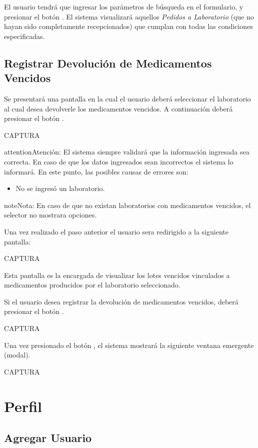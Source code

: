 \documentclass[a4paper,10pt,spanish]{sphinxmanual}
\begin{document}
El usuario tendrá que ingresar los parámetros de búsqueda en el formulario, y presionar el botón . El sistema visualizará aquellos \emph{Pedidos a Laboratorio} (que no hayan sido completamente recepcionados) que cumplan con todas las condiciones especificadas.


\section{Registrar Devolución de Medicamentos Vencidos}
\label{devolucionvencidos::doc}\label{devolucionvencidos:registrar-devolucion-de-medicamentos-vencidos}
Se presentará una pantalla en la cual el usuario deberá seleccionar el laboratorio al cual desea devolverle los medicamentos vencidos. A continuación deberá presionar el botón .

CAPTURA

\begin{notice}{attention}{Atención:}
El sistema siempre validará que la información ingresada sea correcta. En caso de que los datos ingresados sean incorrectos el sistema lo informará. En este punto, las posibles causas de errores son:
\begin{itemize}
\item {} 
No se ingresó un laboratorio.

\end{itemize}
\end{notice}

\begin{notice}{note}{Nota:}
En caso de que no existan laboratorios con medicamentos vencidos, el selector no mostrara opciones.
\end{notice}

Una vez realizado el paso anterior el usuario sera redirigido a la siguiente pantalla:

CAPTURA

Esta pantalla es la encargada de visualizar los lotes vencidos vinculados a medicamentos producidos por el laboratorio seleccionado.

Si el usuario desea registrar la devolución de medicamentos vencidos, deberá presionar el botón .

CAPTURA

Una vez presionado el botón , el sistema mostrará la siguiente ventana emergente (modal).

CAPTURA


\chapter{Perfil}
\label{perfil:perfil}\label{perfil::doc}

\section{Agregar Usuario}
\label{agregarusuario::doc}\label{agregarusuario:agregar-usuario}


\renewcommand{\indexname}{Índice}
\printindex
\end{document}
